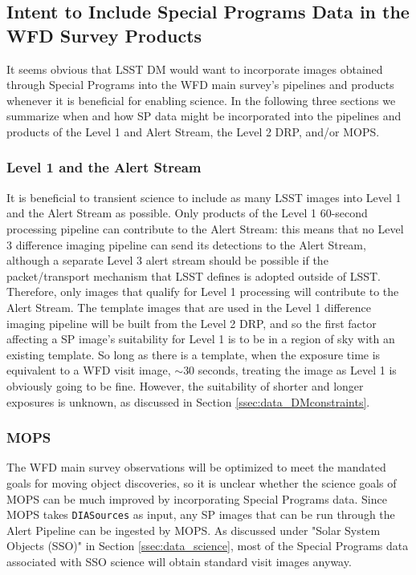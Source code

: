\documentclass[DM,lsstdraft,toc]{lsstdoc}
\begin{document}
\subsection{Intent to Include Special Programs Data in the WFD Survey Products}\label{ssec:dmplans_WFD}

It seems obvious that LSST DM would want to incorporate images obtained through Special Programs into the WFD main survey's pipelines and products whenever it is beneficial for enabling science. In the following three sections we summarize when and how SP data might be incorporated into the pipelines and products of the Level 1 and Alert Stream, the Level 2 DRP, and/or MOPS.

\subsubsection{Level 1 and the Alert Stream}\label{ssec:dmplans_WFD_L1}

It is beneficial to transient science to include as many LSST images into Level 1 and the Alert Stream as possible. Only products of the Level 1 $60$-second processing pipeline can contribute to the Alert Stream: this means that no Level 3 difference imaging pipeline can send its detections to the Alert Stream, although a separate Level 3 alert stream should be possible if the packet/transport mechanism that LSST defines is adopted outside of LSST. Therefore, only images that qualify for Level 1 processing will contribute to the Alert Stream. The template images that are used in the Level 1 difference imaging pipeline will be built from the Level 2 DRP, and so the first factor affecting a SP image's suitability for Level 1 is to be in a region of sky with an existing template. So long as there is a template, when the exposure time is equivalent to a WFD visit image, $\sim 30$ seconds, treating the image as Level 1 is obviously going to be fine. However, the suitability of shorter and longer exposures is unknown, as discussed in Section \ref{ssec:data_DMconstraints}.

\subsubsection{MOPS}\label{ssec:dmplans_WFD_MOPS}

The WFD main survey observations will be optimized to meet the mandated goals for moving object discoveries, so it is unclear whether the science goals of MOPS can be much improved by incorporating Special Programs data. Since MOPS takes {\tt DIASources} as input, any SP images that can be run through the Alert Pipeline can be ingested by MOPS. As discussed under "Solar System Objects (SSO)" in Section \ref{ssec:data_science}, most of the Special Programs data associated with SSO science will obtain standard visit images anyway.
\end{document}
